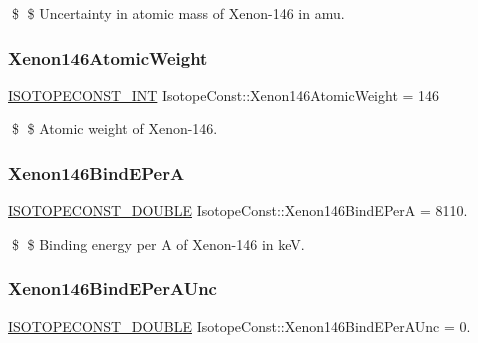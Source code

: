 \$ \$ Uncertainty in atomic mass of Xenon-\/146 in amu. \mbox{\label{group___isotope_const-_xenon-_xe146_ga3fb3b18ec7dadf9423da628572a09ffa}} 
\subsubsection{\texorpdfstring{Xenon146\+Atomic\+Weight}{Xenon146AtomicWeight}}
{\footnotesize\ttfamily \mbox{\hyperlink{group___isotope_const-_macros_ga5f18360b3e99483a35c32d789e62621c}{I\+S\+O\+T\+O\+P\+E\+C\+O\+N\+S\+T\+\_\+\+I\+NT}} Isotope\+Const\+::\+Xenon146\+Atomic\+Weight = 146}

\$ \$ Atomic weight of Xenon-\/146. \mbox{\label{group___isotope_const-_xenon-_xe146_gaada92432863dda465847ef0dd85d6199}} 
\subsubsection{\texorpdfstring{Xenon146\+Bind\+E\+PerA}{Xenon146BindEPerA}}
{\footnotesize\ttfamily \mbox{\hyperlink{group___isotope_const-_macros_ga8f45a7272ce02c0b4c65c44636ed719a}{I\+S\+O\+T\+O\+P\+E\+C\+O\+N\+S\+T\+\_\+\+D\+O\+U\+B\+LE}} Isotope\+Const\+::\+Xenon146\+Bind\+E\+PerA = 8110.}

\$ \$ Binding energy per A of Xenon-\/146 in keV. \mbox{\label{group___isotope_const-_xenon-_xe146_ga8b3029c0707af140ade4ef6105d4bc8f}} 
\subsubsection{\texorpdfstring{Xenon146\+Bind\+E\+Per\+A\+Unc}{Xenon146BindEPerAUnc}}
{\footnotesize\ttfamily \mbox{\hyperlink{group___isotope_const-_macros_ga8f45a7272ce02c0b4c65c44636ed719a}{I\+S\+O\+T\+O\+P\+E\+C\+O\+N\+S\+T\+\_\+\+D\+O\+U\+B\+LE}} Isotope\+Const\+::\+Xenon146\+Bind\+E\+Per\+A\+Unc = 0.}

